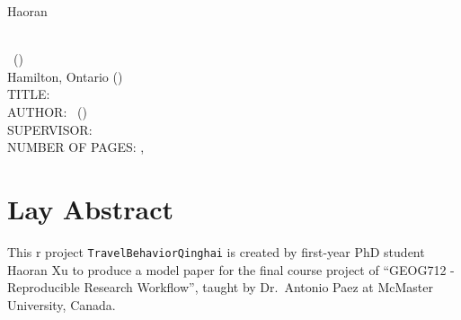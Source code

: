 \documentclass[
11pt, %
oneside, %
english, %
singlespacing, %
]{macthesis} %
\def\blankpage{%
      \clearpage%
      \thispagestyle{empty}%
      \addtocounter{page}{-1}%
      \null%
      \clearpage}
\begin{document}
\hfill\textemdash Haoran

\blankpage
\clearpage




\blankpage
\clearpage


\newpage
{} %
\setcounter{page}{2} %

\noindent %
\univname \\
\degreename\, (\the\year) \\
Hamilton, Ontario (\deptname) \\[1.5cm]
TITLE: \ttitle \\
AUTHOR: \authorname\,  %
(\univname)  \\
SUPERVISOR: \supname\, \\
NUMBER OF PAGES: \pageref{lastoffront}, \pageref{LastPage}  %

\clearpage

\section*{Lay Abstract}
  This r project \texttt{TravelBehaviorQinghai} is created by first-year PhD student Haoran Xu to produce a model paper for the final course project of ``GEOG712 - Reproducible Research Workflow'', taught by Dr.~Antonio Paez at McMaster University, Canada.
\blankpage
\clearpage
\end{document}
